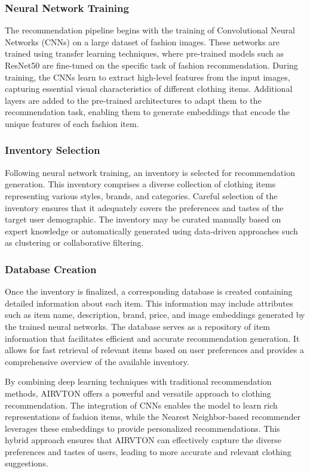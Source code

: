     \subsubsection{Neural Network Training}

    The recommendation pipeline begins with the training of Convolutional Neural Networks (CNNs) on a large dataset of fashion images. These networks are trained using transfer learning techniques, where pre-trained models such as ResNet50 are fine-tuned on the specific task of fashion recommendation. During training, the CNNs learn to extract high-level features from the input images, capturing essential visual characteristics of different clothing items. Additional layers are added to the pre-trained architectures to adapt them to the recommendation task, enabling them to generate embeddings that encode the unique features of each fashion item.

    \subsubsection{Inventory Selection}

    Following neural network training, an inventory is selected for recommendation generation. This inventory comprises a diverse collection of clothing items representing various styles, brands, and categories. Careful selection of the inventory ensures that it adequately covers the preferences and tastes of the target user demographic. The inventory may be curated manually based on expert knowledge or automatically generated using data-driven approaches such as clustering or collaborative filtering.

    \subsubsection{Database Creation}

    Once the inventory is finalized, a corresponding database is created containing detailed information about each item. This information may include attributes such as item name, description, brand, price, and image embeddings generated by the trained neural networks. The database serves as a repository of item information that facilitates efficient and accurate recommendation generation. It allows for fast retrieval of relevant items based on user preferences and provides a comprehensive overview of the available inventory.

    By combining deep learning techniques with traditional recommendation methods, AIRVTON offers a powerful and versatile approach to clothing recommendation. The integration of CNNs enables the model to learn rich representations of fashion items, while the Nearest Neighbor-based recommender leverages these embeddings to provide personalized recommendations. This hybrid approach ensures that AIRVTON can effectively capture the diverse preferences and tastes of users, leading to more accurate and relevant clothing suggestions.

